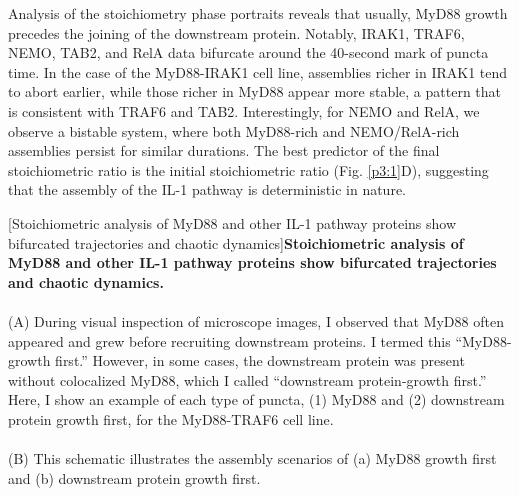 Analysis of the stoichiometry phase portraits reveals that usually, MyD88 growth precedes the joining of the downstream protein. Notably, IRAK1, TRAF6, NEMO, TAB2, and RelA data bifurcate around the 40-second mark of puncta time. In the case of the MyD88-IRAK1 cell line, assemblies richer in IRAK1 tend to abort earlier, while those richer in MyD88 appear more stable, a pattern that is consistent with TRAF6 and TAB2. Interestingly, for NEMO and RelA, we observe a bistable system, where both MyD88-rich and NEMO/RelA-rich assemblies persist for similar durations. The best predictor of the final stoichiometric ratio is the initial stoichiometric ratio (Fig. \ref{p3:1}D), suggesting that the assembly of the IL-1 pathway is deterministic in nature.


\begin{centering}
[Stoichiometric analysis of MyD88 and other IL-1 pathway proteins show bifurcated trajectories and chaotic dynamics]{\textbf{Stoichiometric analysis of MyD88 and other IL-1 pathway proteins show bifurcated trajectories and chaotic dynamics.} 
\\
\\
(A) During visual inspection of microscope images, I observed that MyD88 often appeared and grew before recruiting downstream proteins. I termed this “MyD88-growth first.” However, in some cases, the downstream protein was present without colocalized MyD88, which I called “downstream protein-growth first.” Here, I show an example of each type of puncta, (1) MyD88 and (2) downstream protein growth first, for the MyD88-TRAF6 cell line.
\\
\\
(B) This schematic illustrates the assembly scenarios of (a) MyD88 growth first and (b) downstream protein growth first.
}
\end{centering}

